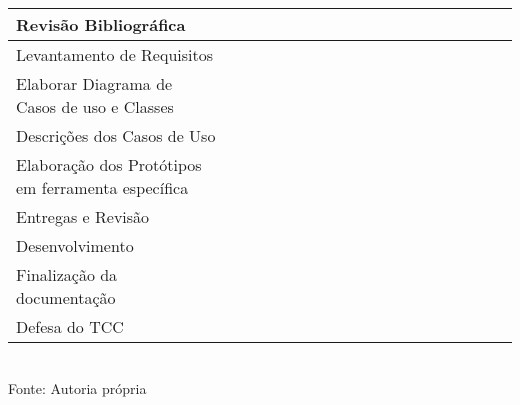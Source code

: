 \begin{quadro}[H]
\begin{center}
\begin{tabular}{|m{3.5cm}|m{.2cm}|m{.2cm}|m{.2cm}|m{.2cm}|m{.2cm}|m{.2cm}|m{.2cm}|m{.2cm}|m{.2cm}|m{.2cm}|m{.2cm}|m{.2cm}|m{.2cm}|m{.2cm}|m{.2cm}|m{.2cm}|m{.2cm}|m{.2cm}|}
			Revisão Bibliográfica & & & & & &  \cellcolor{gray!50} &\cellcolor{gray!50} &\cellcolor{gray!50} & \cellcolor{gray!50} & & & & & & & & & \\
			\hline
			Levantamento de Requisitos  & & & & & & &\cellcolor{gray!50} &\cellcolor{gray!50} &\cellcolor{gray!50}& & & & & & & & & \\
			\hline
			Elaborar Diagrama de Casos de uso e Classes  & & & & & & & & &\cellcolor{gray!50} &\cellcolor{gray!50} & & & & & & & & \\
			\hline
			Descrições dos Casos de Uso  & & & & & & & & &\cellcolor{gray!50} &\cellcolor{gray!50} & & & & & & & & \\
			\hline
			Elaboração dos Protótipos em ferramenta específica & & & & & & & & & &\cellcolor{gray!50} &\cellcolor{gray!50} &  \cellcolor{gray!50} & & & & & & \\
			\hline
			Entregas e Revisão & & & & & & & & & & & & & &\cellcolor{gray!50} &\cellcolor{gray!50} &\cellcolor{gray!50} & & \\ 
			\hline
			Desenvolvimento  & & & & & & &\cellcolor{gray!50} &\cellcolor{gray!50} &\cellcolor{gray!50} &\cellcolor{gray!50} &\cellcolor{gray!50} &\cellcolor{gray!50} &\cellcolor{gray!50} &\cellcolor{gray!50} &\cellcolor{gray!50} &\cellcolor{gray!50} &\cellcolor{gray!50} & \\
			\hline
			Finalização da documentação  & & & & & & & & & & & & & & & & &\cellcolor{gray!50} & \\
			\hline
			Defesa do TCC & & & & & & & & & & & & & & & & & &\cellcolor{gray!50} \\
			\hline
		\end{tabular}
		\vspace{0.5cm}	\\Fonte: Autoria própria
	\end{center}
\end{quadro}